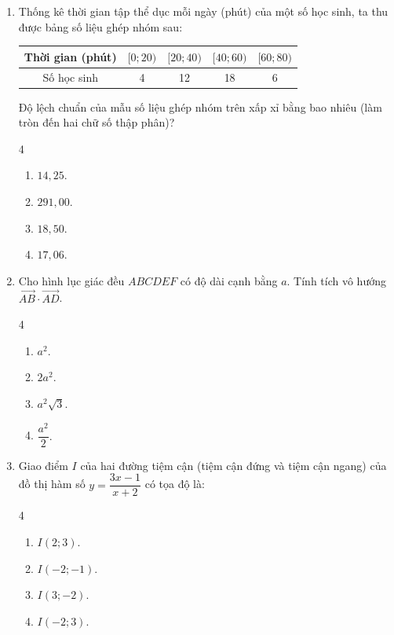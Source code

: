 \documentclass[12pt]{article}
\begin{document}
\begin{enumerate}[label=\textbf{Câu \arabic*.}, leftmargin=*]
		\item Thống kê thời gian tập thể dục mỗi ngày (phút) của một số học sinh, ta thu được bảng số liệu ghép nhóm sau:
		\begin{center}
			\renewcommand{\arraystretch}{1.2}
			\begin{tabular}{|c|c|c|c|c|}
				\hline
				Thời gian (phút) & $[0; 20)$ & $[20; 40)$ & $[40; 60)$ & $[60; 80)$ \\
				\hline
				Số học sinh & 4 & 12 & 18 & 6 \\
				\hline
			\end{tabular}
		\end{center}
		Độ lệch chuẩn của mẫu số liệu ghép nhóm trên xấp xỉ bằng bao nhiêu (làm tròn đến hai chữ số thập phân)?
		\begin{multicols}{4}
			\begin{enumerate}[label=\Alph*.]
				\item $14,25$.
				\item $291,00$.
				\item $18,50$.
				\item $17,06$.
			\end{enumerate}
		\end{multicols}
		
		\item Cho hình lục giác đều $ABCDEF$ có độ dài cạnh bằng $a$. Tính tích vô hướng $\overrightarrow{AB} \cdot \overrightarrow{AD}$.
		\begin{multicols}{4}
			\begin{enumerate}[label=\Alph*.]
				\item $a^2$.
				\item $2a^2$.
				\item $a^2\sqrt{3}$.
				\item $\dfrac{a^2}{2}$.
			\end{enumerate}
		\end{multicols}
		
		\item Giao điểm $I$ của hai đường tiệm cận (tiệm cận đứng và tiệm cận ngang) của đồ thị hàm số $y = \dfrac{3x - 1}{x + 2}$ có tọa độ là:
		\begin{multicols}{4}
			\begin{enumerate}[label=\Alph*.]
				\item $I(2; 3)$.
				\item $I(-2; -1)$.
				\item $I(3; -2)$.
				\item $I(-2; 3)$.
			\end{enumerate}
		\end{multicols}
		

\end{enumerate}
\end{document}
